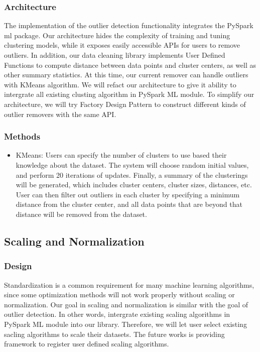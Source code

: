 \documentclass[sigconf]{acmart}
\begin{document}
\subsubsection{Architecture}
The implementation of the outlier detection functionality integrates the PySpark ml package. Our architecture hides the complexity of training and tuning clustering models, while it exposes easily accessible APIs for users to remove outliers. In addition, our data cleaning library implements User Defined Functions to compute distance between data points and cluster centers, as well as other summary statistics. At this time, our current remover can handle outliers with KMeans algorithm. We will refact our architecture to give it ability to intergrate all existing clusting algorithm in PySpark ML module. To simplify our architecture, we will try Factory Design Pattern to construct different kinds of outlier removers with the same API.

\subsubsection{Methods}
\begin{itemize}
	\item{KMeans}\cite{KMeans}: Users can specify the number of clusters to use based their knowledge about the dataset. The system will choose random initial values, and perform 20 iterations of updates. Finally, a summary of the clusterings will be generated, which includes cluster centers, cluster sizes, distances, etc. User can then filter out outliers in each cluster by specifying a minimum distance from the cluster center, and all data points that are beyond that distance will be removed from the dataset.
\end{itemize}

\subsection{Scaling and Normalization}
\subsubsection{Design}
Standardization is a common requirement for many machine learning algorithms, since some optimization methods will not work properly without scaling or normalization\cite{convex}. Our goal in scaling and normalization is similar with the goal of outlier detection. In other words, intergrate existing scaling algorithms in PySpark ML module into our library. Therefore, we will let user select existing sacling algorithms to scale their datasets. The future works is providing framework to register user defined scaling algorithms.
\end{document}
